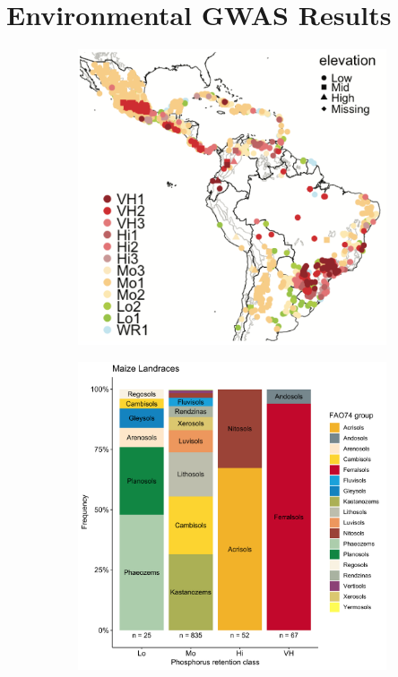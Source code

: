 \documentclass[10pt,letterpaper]{article}
\begin{document}
\section*{Environmental GWAS Results}
\begin{figure}[!b] %
\centering
\begin{subfigure}[h]{0.4\linewidth}
   \centering
   \includegraphics[width=\linewidth]{fig3a.png}
   \caption{}
   \label{fig:fig3a}
\end{subfigure}
\hfill
\begin{subfigure}{0.4\linewidth}
   \centering
   \includegraphics[width=\linewidth]{fig3.pdf}

\end{subfigure}
\end{figure}
\end{document}

